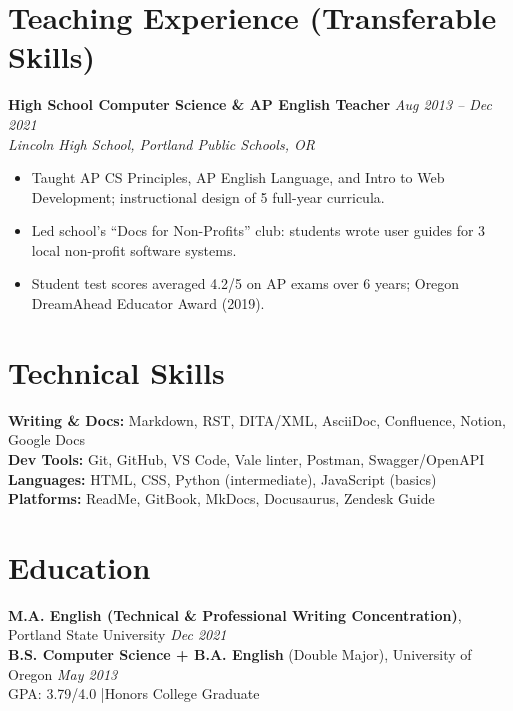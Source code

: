 \documentclass[11pt,a4paper]{article}
\begin{document}
\section{Teaching Experience (Transferable Skills)}

\noindent\textbf{High School Computer Science \& AP English Teacher} \hfill \textit{Aug 2013 -- Dec 2021}\\
\textit{Lincoln High School, Portland Public Schools, OR}
\begin{itemize}
  \item Taught AP CS Principles, AP English Language, and Intro to Web Development; instructional design of 5 full-year curricula.
  \item Led school's ``Docs for Non-Profits'' club: students wrote user guides for 3 local non-profit software systems.
  \item Student test scores averaged 4.2/5 on AP exams over 6 years; Oregon DreamAhead Educator Award (2019).
\end{itemize}

\section{Technical Skills}
\textbf{Writing \& Docs:} Markdown, RST, DITA/XML, AsciiDoc, Confluence, Notion, Google Docs\\
\textbf{Dev Tools:} Git, GitHub, VS Code, Vale linter, Postman, Swagger/OpenAPI\\
\textbf{Languages:} HTML, CSS, Python (intermediate), JavaScript (basics)\\
\textbf{Platforms:} ReadMe, GitBook, MkDocs, Docusaurus, Zendesk Guide

\section{Education}
\textbf{M.A. English (Technical \& Professional Writing Concentration)}, Portland State University \hfill \textit{Dec 2021}\\
\textbf{B.S. Computer Science + B.A. English} (Double Major), University of Oregon \hfill \textit{May 2013}\\
GPA: 3.79/4.0 \quad|\quad Honors College Graduate
\end{document}

